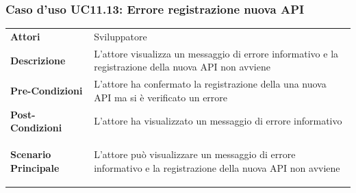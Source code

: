 \subsubsection{Caso d'uso UC11.13: Errore registrazione nuova API}
\label{UC11_13}

\begin{minipage}{\linewidth}
	\begin{tabular}{ l | p{11cm}}
		\hline
		\rowcolor{Gray}
		\multicolumn{2}{c}{UC11.13 - Errore registrazione nuova API} \\
		\hline
		\textbf{Attori} & Sviluppatore \\
		\textbf{Descrizione} & L'attore visualizza un messaggio di errore informativo e la registrazione della nuova API non avviene \\
		\textbf{Pre-Condizioni} & L'attore ha confermato la registrazione della una nuova API ma si è verificato un errore \\
		\textbf{Post-Condizioni} & L'attore ha visualizzato un messaggio di errore informativo \\
		\textbf{Scenario Principale} & 
		\begin{enumerate*}[label=(\arabic*.),itemjoin={\newline}]
			\item L'attore può visualizzare un messaggio di errore informativo e la registrazione della nuova API non avviene
		\end{enumerate*}\\
	\end{tabular}
\end{minipage}
